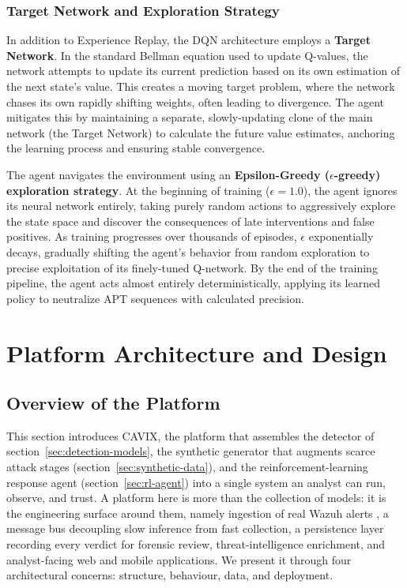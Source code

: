 \subsubsection{Target Network and Exploration Strategy}

In addition to Experience Replay, the DQN architecture employs a \textbf{Target Network}. In the standard Bellman equation used to update Q-values, the network attempts to update its current prediction based on its own estimation of the next state's value. This creates a moving target problem, where the network chases its own rapidly shifting weights, often leading to divergence. The agent mitigates this by maintaining a separate, slowly-updating clone of the main network (the Target Network) to calculate the future value estimates, anchoring the learning process and ensuring stable convergence.

The agent navigates the environment using an \textbf{Epsilon-Greedy ($\epsilon$-greedy) exploration strategy}. At the beginning of training ($\epsilon = 1.0$), the agent ignores its neural network entirely, taking purely random actions to aggressively explore the state space and discover the consequences of late interventions and false positives. As training progresses over thousands of episodes, $\epsilon$ exponentially decays, gradually shifting the agent's behavior from random exploration to precise exploitation of its finely-tuned Q-network. By the end of the training pipeline, the agent acts almost entirely deterministically, applying its learned policy to neutralize APT sequences with calculated precision.



\section{Platform Architecture and Design}

\subsection{Overview of the Platform}
\label{sec:platform-overview} 

This section introduces CAVIX, the platform that assembles the
detector of section~\ref{sec:detection-models}, the synthetic
generator that augments scarce attack stages
(section~\ref{sec:synthetic-data}), and the reinforcement-learning
response agent (section~\ref{sec:rl-agent}) into a single system an
analyst can run, observe, and trust. A platform here is more than the
collection of models: it is the engineering surface around them,
namely ingestion of real Wazuh alerts \cite{wazuh2024}, a message
bus decoupling slow inference from fast collection, a persistence
layer recording every verdict for forensic review, threat-intelligence
enrichment, and analyst-facing web and mobile applications. We
present it through four architectural concerns: structure, behaviour,
data, and deployment.

